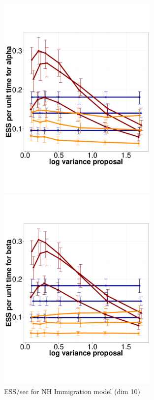   \begin{figure}%
  \centering
  \begin{minipage}[!hp]{0.45\linewidth}
  \centering
    \includegraphics [width=0.70\textwidth, angle=0]{figs/pc_10_alpha.pdf}
      \end{minipage}
  \begin{minipage}[!hp]{0.45\linewidth}
  \centering
    \includegraphics [width=0.70\textwidth, angle=0]{figs/pc_10_beta.pdf}
    \vspace{-0 in}
  \end{minipage}
     \label{fig:ESS_pc_10}
    \caption{ESS/sec for NH Immigration model (dim 10)}
  \end{figure}
